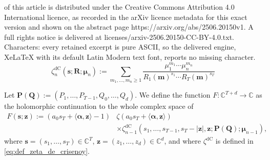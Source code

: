 \documentclass[10pt,a4paper]{amsart}
\newcommand{\dc}{\mathrm{dC}}
\begin{document}
of this article is distributed under the Creative Commons Attribution 4.0 International licence, as recorded in the arXiv licence metadata for this exact version and shown on the abstract page https://arxiv.org/abs/2506.20150v1. A full rights notice is delivered at licenses/arxiv-2506.20150-CC-BY-4.0.txt. Characters: every retained excerpt is pure ASCII, so the delivered engine, XeLaTeX with its default Latin Modern text font, reports no missing character.
\begin{equation}
    \zeta_{n}^{\dc}(\mathbf{s};\mathbf{R};\boldsymbol{\mu}_n) := \sum_{m_1,\ldots,m_n \geq 1} \frac{\mu_1^{m_1} \cdots \mu_n^{m_n}}{R_1(\mathbf{m})^{s_1} \cdots R_T(\mathbf{m})^{s_T}} \label{eq:def_zeta_de_crisenoy}
\end{equation}

\begin{definition}
\label{def:F}
Let $\mathbf{P(Q)}:=(P_1,\ldots,P_{T-1},Q_0,\ldots, Q_d)$. We define the function $F:\mathbb{C}^{T+d} \to \mathbb{C}$ as the holomorphic continuation to the whole complex space of
\begin{align*}
    F(\mathbf{s};\mathbf{z}):= (a_0s_T+\langle \boldsymbol{\alpha},\mathbf{z} \rangle-1) &\zeta(a_0s_T+\langle \boldsymbol{\alpha},\mathbf{z} \rangle) \\
    & \times \zeta_{n-1}^{\dc}\left(s_1,\ldots,s_{T-1},s_T-|\mathbf{z}|,\mathbf{z}; \mathbf{P(Q)};\boldsymbol{\mu}_{n-1}\right),
\end{align*}
where $\mathbf{s}=(s_1,\ldots,s_T) \in \mathbb{C}^T$, $\mathbf{z}=(z_1,\ldots,z_d) \in \mathbb{C}^d$, and where $\zeta^{\dc}$ is defined in \eqref{eq:def_zeta_de_crisenoy}.
\end{definition}
\end{document}

